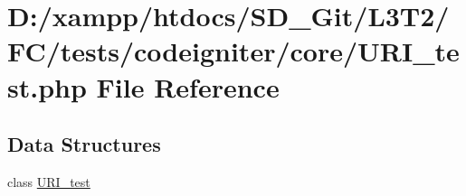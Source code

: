 \hypertarget{tests_2codeigniter_2core_2_u_r_i__test_8php}{}\section{D\+:/xampp/htdocs/\+S\+D\+\_\+\+Git/\+L3\+T2/\+F\+C/tests/codeigniter/core/\+U\+R\+I\+\_\+test.php File Reference}
\label{tests_2codeigniter_2core_2_u_r_i__test_8php}
\subsection*{Data Structures}
\begin{DoxyCompactItemize}
\item 
class \hyperlink{class_u_r_i__test}{U\+R\+I\+\_\+test}
\end{DoxyCompactItemize}
